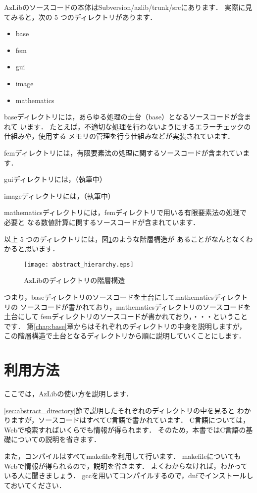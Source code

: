 AzLibのソースコードの本体はSubversion/azlib/trunk/srcにあります．
実際に見てみると，次の $5$ つのディレクトリがあります．
\begin{itemize}
	\item base
	\item fem
	\item gui
	\item image
	\item mathematics
\end{itemize}

baseディレクトリには，あらゆる処理の土台（base）となるソースコードが含まれて
います．
たとえば，不適切な処理を行わないようにするエラーチェックの仕組みや，使用する
メモリの管理を行う仕組みなどが実装されています．

femディレクトリには，有限要素法の処理に関するソースコードが含まれています．

guiディレクトリには，（執筆中）

imageディレクトリには，（執筆中）

mathematicsディレクトリには，femディレクトリで用いる有限要素法の処理で必要と
なる数値計算に関するソースコードが含まれています．

以上 $5$ つのディレクトリには，図\ref{fg:abstract_hierarchy}のような階層構造が
あることがなんとなくわかると思います．
\begin{figure}
	\centering \texttt{[image: abstract\_hierarchy.eps]}
	\caption{AzLibのディレクトリの階層構造} \label{fg:abstract_hierarchy}
\end{figure}
つまり，baseディレクトリのソースコードを土台にしてmathematicsディレクトリの
ソースコードが書かれており，mathematicsディレクトリのソースコードを土台にして
femディレクトリのソースコードが書かれており，・・・ということです．
第\ref{chap:base}章からはそれぞれのディレクトリの中身を説明しますが，
この階層構造で土台となるディレクトリから順に説明していくことにします．


\section{利用方法} \label{sec:abstract_usage}
ここでは，AzLibの使い方を説明します．

\ref{sec:abstract_directory}節で説明したそれぞれのディレクトリの中を見ると
わかりますが，ソースコードはすべてC言語で書かれています．
C言語については，Webで検索すればいくらでも情報が得られます．
そのため，本書ではC言語の基礎についての説明を省きます．

また，コンパイルはすべてmakefileを利用して行います．
makefileについてもWebで情報が得られるので，説明を省きます．
よくわからなければ，わかっている人に聞きましょう．
gccを用いてコンパイルするので，dnfでインストールしておいてください．

